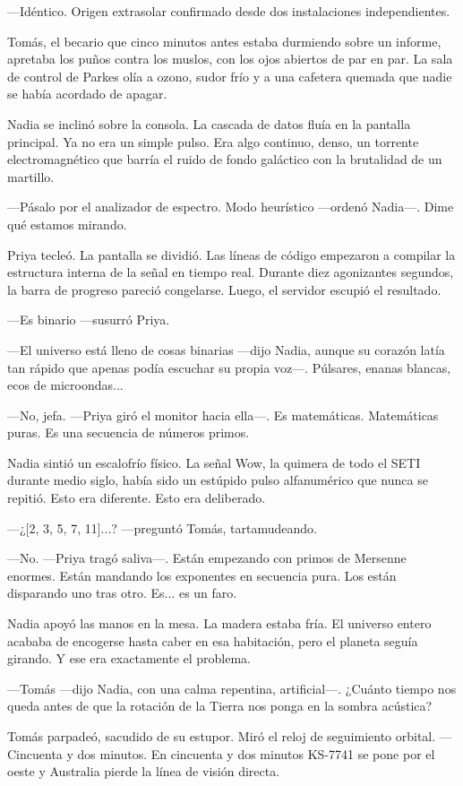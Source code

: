 \documentclass[11pt,a5paper,twoside]{book}
\begin{document}
—Idéntico. Origen extrasolar confirmado desde dos instalaciones independientes.

Tomás, el becario que cinco minutos antes estaba durmiendo sobre un informe, apretaba los puños contra los muslos, con los ojos abiertos de par en par. La sala de control de Parkes olía a ozono, sudor frío y a una cafetera quemada que nadie se había acordado de apagar.

Nadia se inclinó sobre la consola. La cascada de datos fluía en la pantalla principal. Ya no era un simple pulso. Era algo continuo, denso, un torrente electromagnético que barría el ruido de fondo galáctico con la brutalidad de un martillo.

—Pásalo por el analizador de espectro. Modo heurístico —ordenó Nadia—. Dime qué estamos mirando.

Priya tecleó. La pantalla se dividió. Las líneas de código empezaron a compilar la estructura interna de la señal en tiempo real. Durante diez agonizantes segundos, la barra de progreso pareció congelarse. Luego, el servidor escupió el resultado.

—Es binario —susurró Priya.

—El universo está lleno de cosas binarias —dijo Nadia, aunque su corazón latía tan rápido que apenas podía escuchar su propia voz—. Púlsares, enanas blancas, ecos de microondas...

—No, jefa. —Priya giró el monitor hacia ella—. Es matemáticas. Matemáticas puras. Es una secuencia de números primos.

Nadia sintió un escalofrío físico. La señal Wow, la quimera de todo el SETI durante medio siglo, había sido un estúpido pulso alfanumérico que nunca se repitió. Esto era diferente. Esto era deliberado.

—¿[2, 3, 5, 7, 11]...? —preguntó Tomás, tartamudeando.

—No. —Priya tragó saliva—. Están empezando con primos de Mersenne enormes. Están mandando los exponentes en secuencia pura. Los están disparando uno tras otro. Es... es un faro.

Nadia apoyó las manos en la mesa. La madera estaba fría. El universo entero acababa de encogerse hasta caber en esa habitación, pero el planeta seguía girando. Y ese era exactamente el problema.

—Tomás —dijo Nadia, con una calma repentina, artificial—. ¿Cuánto tiempo nos queda antes de que la rotación de la Tierra nos ponga en la sombra acústica?

Tomás parpadeó, sacudido de su estupor. Miró el reloj de seguimiento orbital.
—Cincuenta y dos minutos. En cincuenta y dos minutos KS-7741 se pone por el oeste y Australia pierde la línea de visión directa.
\end{document}
